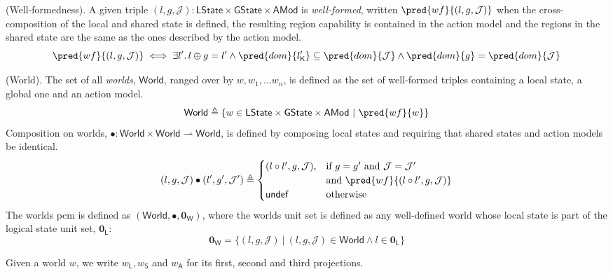 \begin{defn}
	(Well-formedness).
	A given triple $(l, g, \mathcal{J}) : \mathsf{LState} \times \mathsf{GState} \times \mathsf{AMod}$ is \emph{well-formed}, written $\pred{wf}{(l, g, \mathcal{J})}$ when the cross-composition of the local and shared state is defined, the resulting region capability is contained in the action model and the regions in the shared state are the same as the ones described by the action model.
	\[
		\pred{wf}{(l, g, \mathcal{J})} \iff \exists l' \ldotp l \oplus g = l' \land \pred{dom}{l'_\mathsf{K}} \subseteq \pred{dom}{\mathcal{J}} \land \pred{dom}{g} = \pred{dom}{\mathcal{J}}
	\]
\end{defn}

\begin{defn}
	(World).
	The set of all \emph{worlds}, $\mathsf{World}$, ranged over by $w, w_1, \ldots w_n$, is defined as the set of well-formed triples containing a local state, a global one and an action model.
	\[
		\mathsf{World} \triangleq \{ w \in \mathsf{LState} \times \mathsf{GState} \times \mathsf{AMod}\ |\ \pred{wf}{w} \}
	\]
	Composition on worlds, $\bullet : \mathsf{World} \times \mathsf{World} \rightharpoonup \mathsf{World}$, is defined by composing local states and requiring that shared states and action models be identical.
	\[
		(l, g, \mathcal{J}) \bullet (l', g', \mathcal{J}') \triangleq
		\begin{cases}
			(l \circ l', g, \mathcal{J}), & \text{if } g = g' \text{ and } \mathcal{J} = \mathcal{J}' \\ & \text{and } \pred{wf}{(l \circ l', g, \mathcal{J})}
			\\
			\mathsf{undef} & \text{otherwise}
		\end{cases}
	\]
	The worlds pcm is defined as $(\mathsf{World}, \bullet, \mathbf{0}_\mathsf{W})$, where the worlds unit set is defined as any well-defined world whose local state is part of the logical state unit set, $\mathbf{0}_\mathsf{L}$:
	\[
		\mathbf{0}_\mathsf{W} = \{ (l, g, \mathcal{J})\ |\ (l, g, \mathcal{J}) \in \mathsf{World} \land l \in \mathbf{0}_\mathsf{L} \}
	\]
\end{defn}
Given a world $w$, we write $w_\mathsf{L}, w_\mathsf{S}$ and $w_\mathsf{A}$ for its first, second and third projections.